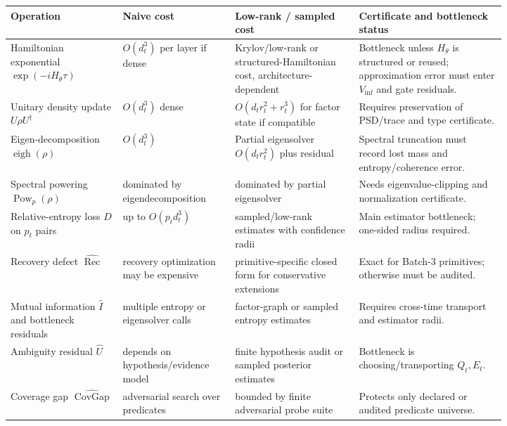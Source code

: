 \documentclass[11pt,a4paper]{article}
\newcommand{\Rec}{\operatorname{Rec}}
\newcommand{\CovGap}{\operatorname{CovGap}}
\begin{document}
\begingroup\small\sloppy
\begin{longtable}{>{\raggedright\arraybackslash}p{0.19\linewidth}>{\raggedright\arraybackslash}p{0.17\linewidth}>{\raggedright\arraybackslash}p{0.21\linewidth}>{\raggedright\arraybackslash}p{0.25\linewidth}}
\toprule
\textbf{Operation} & \textbf{Naive cost} & \textbf{Low-rank / sampled cost} & \textbf{Certificate and bottleneck status}\\
\midrule
\endhead
\bottomrule
\endlastfoot
Hamiltonian exponential \(\exp(-iH_\theta\tau)\) & \(O(d_t^3)\) per layer if dense & Krylov/low-rank or structured-Hamiltonian cost, architecture-dependent & Bottleneck unless \(H_\theta\) is structured or reused; approximation error must enter \(V_{\mathrm{inf}}\) and gate residuals.\\
Unitary density update \(U\rho U^\dagger\) & \(O(d_t^3)\) dense & \(O(d_t r_t^2+r_t^3)\) for factor state if compatible & Requires preservation of PSD/trace and type certificate.\\
Eigen-decomposition \(\operatorname{eigh}(\rho)\) & \(O(d_t^3)\) & Partial eigensolver \(O(d_t r_t^2)\) plus residual & Spectral truncation must record lost mass and entropy/coherence error.\\
Spectral powering \(\operatorname{Pow}_p(\rho)\) & dominated by eigendecomposition & dominated by partial eigensolver & Needs eigenvalue-clipping and normalization certificate.\\
Relative-entropy loss \(\widehat D\) on \(p_t\) pairs & up to \(O(p_t d_t^3)\) & sampled/low-rank estimates with confidence radii & Main estimator bottleneck; one-sided radius required.\\
Recovery defect \(\widehat{\Rec}\) & recovery optimization may be expensive & primitive-specific closed form for conservative extensions & Exact for Batch-3 primitives; otherwise must be audited.\\
Mutual information \(\widehat I\) and bottleneck residuals & multiple entropy or eigensolver calls & factor-graph or sampled entropy estimates & Requires cross-time transport and estimator radii.\\
Ambiguity residual \(\widehat U\) & depends on hypothesis/evidence model & finite hypothesis audit or sampled posterior estimates & Bottleneck is choosing/transporting \(Q_t,E_t\).\\
Coverage gap \(\widehat{\CovGap}\) & adversarial search over predicates & bounded by finite adversarial probe suite & Protects only declared or audited predicate universe.\\

\end{longtable}
\end{document}
